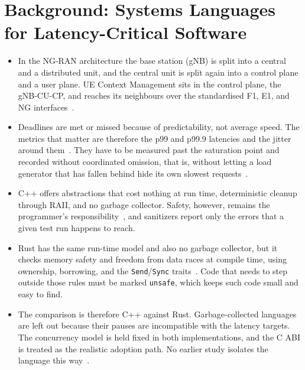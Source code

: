 \documentclass[english,twoside,openright,a4paper,censored,csm,software-track-2020]{HYthesisML}
\begin{document}
\chapter{Background: Systems Languages for Latency-Critical Software\label{chapter:background}}

\begin{itemize}
  \item In the NG-RAN architecture the base station (gNB) is split into a central and a
        distributed unit, and the central unit is split again into a control plane and a user
        plane. UE Context Management sits in the control plane, the gNB-CU-CP, and reaches its
        neighbours over the standardised F1, E1, and NG interfaces~\cite{3gpp38401}.
  \item Deadlines are met or missed because of predictability, not average speed. The metrics
        that matter are therefore the p99 and p99.9 latencies and the jitter around
        them~\cite{dean2013tail}. They have to be measured past the saturation point and
        recorded without coordinated omission, that is, without letting a load generator that
        has fallen behind hide its own slowest requests~\cite{tene_hdrhistogram}.
  \item C++ offers abstractions that cost nothing at run time, deterministic cleanup through
        RAII, and no garbage collector. Safety, however, remains the programmer's
        responsibility~\cite{szekeres2013sok}, and sanitizers report only the errors that a
        given test run happens to reach.
  \item Rust has the same run-time model and also no garbage collector, but it checks memory
        safety and freedom from data races at compile time, using ownership, borrowing, and the
        \texttt{Send}/\texttt{Sync} traits~\cite{jung2021safe}. Code that needs to step outside
        those rules must be marked \texttt{unsafe}, which keeps such code small and easy to
        find.
  \item The comparison is therefore C++ against Rust. Garbage-collected languages are left out
        because their pauses are incompatible with the latency targets. The concurrency model
        is held fixed in both implementations, and the C ABI is treated as the realistic
        adoption path. No earlier study isolates the language this way~\cite{karlback2021ran}.
\end{itemize}
\end{document}
